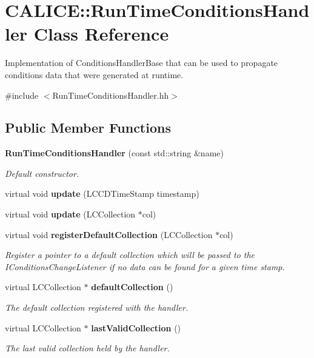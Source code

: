 \section{CALICE::RunTimeConditionsHandler Class Reference}
\label{classCALICE_1_1RunTimeConditionsHandler}


Implementation of ConditionsHandlerBase that can be used to propagate conditions data that were generated at runtime.  


{\ttfamily \#include $<$RunTimeConditionsHandler.hh$>$}\subsection*{Public Member Functions}
\begin{DoxyCompactItemize}
\item 
{\bf RunTimeConditionsHandler} (const std::string \&name)
\begin{DoxyCompactList}\small\item\em Default constructor. \item\end{DoxyCompactList}\item 
virtual void {\bfseries update} (LCCDTimeStamp timestamp)\label{classCALICE_1_1RunTimeConditionsHandler_a2512774ec5cc836083d0e33d5bdf2bc2}

\item 
virtual void {\bfseries update} (LCCollection $\ast$col)\label{classCALICE_1_1RunTimeConditionsHandler_a05f4714fa0493f98faeb3efa8b6fce1e}

\item 
virtual void {\bf registerDefaultCollection} (LCCollection $\ast$col)\label{classCALICE_1_1RunTimeConditionsHandler_a40b4326a9b931702afdd3bd6f6cdad31}

\begin{DoxyCompactList}\small\item\em Register a pointer to a default collection which will be passed to the IConditionsChangeListener if no data can be found for a given time stamp. \item\end{DoxyCompactList}\item 
virtual LCCollection $\ast$ {\bf defaultCollection} ()\label{classCALICE_1_1RunTimeConditionsHandler_a211c66b829f2f9942612667b04da119b}

\begin{DoxyCompactList}\small\item\em The default collection registered with the handler. \item\end{DoxyCompactList}\item 
virtual LCCollection $\ast$ {\bf lastValidCollection} ()\label{classCALICE_1_1RunTimeConditionsHandler_a0867758af207626a60529ab86ea9fd64}

\begin{DoxyCompactList}\small\item\em The last valid collection held by the handler. \item\end{DoxyCompactList}\end{DoxyCompactItemize}
